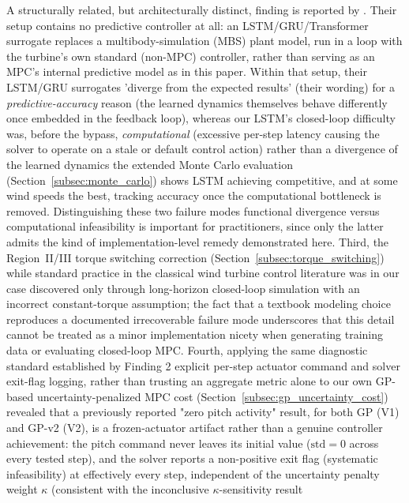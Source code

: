 A structurally related, but architecturally distinct, finding is
reported by \citet{witter_creating_2025}. Their setup contains no
predictive controller at all: an LSTM/GRU/Transformer surrogate replaces
a multibody-simulation (MBS) plant model, run in a loop with the
turbine's own standard (non-MPC) controller, rather than serving as an
MPC's internal predictive model as in this paper. Within that setup,
their LSTM/GRU surrogates 'diverge from the expected results' (their
wording) for a \emph{predictive-accuracy} reason (the learned dynamics
themselves behave differently once embedded in the feedback loop), whereas
our LSTM's closed-loop difficulty was, before the bypass,
\emph{computational} (excessive per-step latency causing the solver to
operate on a stale or default control action) rather than a divergence of
the learned dynamics  the extended Monte Carlo evaluation
(Section~\ref{subsec:monte_carlo}) shows LSTM achieving competitive, and
at some wind speeds the best, tracking accuracy once the computational
bottleneck is removed. Distinguishing these two failure modes 
functional divergence versus computational infeasibility  is
important for practitioners, since only the latter admits the kind of
implementation-level remedy demonstrated here. Third,
the Region~II/III torque switching correction
(Section~\ref{subsec:torque_switching}) while standard practice in the
classical wind turbine control literature \citep{bianchi2006,pao2009} was
in our case discovered only through long-horizon closed-loop simulation
with an incorrect constant-torque assumption; the fact that a textbook
modeling choice reproduces a documented irrecoverable failure mode
underscores that this detail cannot be treated as a minor implementation
nicety when generating training data or evaluating closed-loop MPC.
\label{subsec:gp_frozen_actuator_finding}
Fourth, applying the same diagnostic standard established by Finding 2
 explicit per-step actuator command and solver exit-flag logging,
rather than trusting an aggregate metric alone  to our own GP-based
uncertainty-penalized MPC cost (Section~\ref{subsec:gp_uncertainty_cost})
revealed that a previously reported "zero pitch activity" result, for
both GP (V1) and GP-v2 (V2), is a frozen-actuator artifact rather than a
genuine controller achievement: the pitch command never leaves its
initial value ($\text{std}=0$ across every tested step), and the solver
reports a non-positive exit flag (systematic infeasibility) at
effectively every step, independent of the uncertainty penalty weight
$\kappa$ (consistent with the inconclusive $\kappa$-sensitivity result
